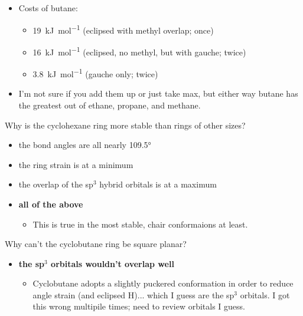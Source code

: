 \documentclass[12pt,a4paper]{article}
\begin{document}
\begin{enumerate}
\begin{itemize}
\begin{itemize}
                \item Costs of butane: 
                    \begin{itemize}
                        \item \SI{19}{kJ\per\mole} (eclipsed with methyl overlap; once) 
                        \item \SI{16}{kJ\per\mole} (eclipsed, no methyl, but with gauche; twice)
                        \item \SI{3.8}{kJ\per\mole} (gauche only; twice)
                    \end{itemize}
                \item I'm not sure if you add them up or just take max, but either way butane has the greatest out of ethane, propane, and methane.
            \end{itemize}
        \end{itemize}
    {\color{G-Moon}\item Why is the cyclohexane ring more stable than rings of other sizes?
    \begin{itemize}
        \item the bond angles are all nearly \ang{109.5}
        \item the ring strain is at a minimum
        \item the overlap of the sp\(^{3}\) hybrid orbitals is at a maximum
    \end{itemize}}
        \begin{itemize}
            \item {\color{o-Sun}\textbf{all of the above}}
            \begin{itemize}
                \item This is true in the most stable, chair conformaions at least.
            \end{itemize}
        \end{itemize}
    {\color{G-Moon}\item Why can't the cyclobutane ring be square planar?}
        \begin{itemize}
            \item {\color{o-Sun}\textbf{the sp\(^{3}\) orbitals wouldn't overlap well}}
            \begin{itemize}
                \item Cyclobutane adopts a slightly puckered conformation in order to reduce angle strain (and eclipsed H)... which I guess are the sp\(^{3}\) orbitals. I got this wrong multipile times; need to review orbitals I guess.

\end{itemize}
\end{itemize}
\end{enumerate}
\end{document}
